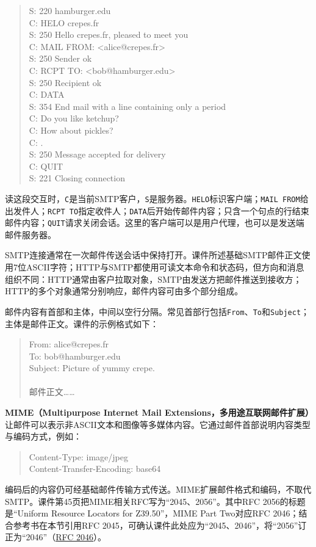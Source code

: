 \begin{quote}\small\ttfamily
S: 220 hamburger.edu\\
C: HELO crepes.fr\\
S: 250 Hello crepes.fr, pleased to meet you\\
C: MAIL FROM: <alice@crepes.fr>\\
S: 250 Sender ok\\
C: RCPT TO: <bob@hamburger.edu>\\
S: 250 Recipient ok\\
C: DATA\\
S: 354 End mail with a line containing only a period\\
C: Do you like ketchup?\\
C: How about pickles?\\
C: .\\
S: 250 Message accepted for delivery\\
C: QUIT\\
S: 221 Closing connection
\end{quote}

读这段交互时，\texttt{C}是当前SMTP客户，\texttt{S}是服务器。\texttt{HELO}标识客户端；\texttt{MAIL FROM}给出发件人；\texttt{RCPT TO}指定收件人；\texttt{DATA}后开始传邮件内容；只含一个句点的行结束邮件内容；\texttt{QUIT}请求关闭会话。这里的客户端可以是用户代理，也可以是发送端邮件服务器。

SMTP连接通常在一次邮件传送会话中保持打开。课件所述基础SMTP邮件正文使用7位ASCII字符；HTTP与SMTP都使用可读文本命令和状态码，但方向和消息组织不同：HTTP通常由客户拉取对象，SMTP由发送方把邮件推送到接收方；HTTP的多个对象通常分别响应，邮件内容可由多个部分组成。

邮件内容有首部和主体，中间以空行分隔。常见首部行包括\texttt{From}、\texttt{To}和\texttt{Subject}；主体是邮件正文。课件的示例格式如下：
\begin{quote}\small\ttfamily
From: alice@crepes.fr\\
To: bob@hamburger.edu\\
Subject: Picture of yummy crepe.\\
\\
邮件正文……
\end{quote}

\textbf{MIME（Multipurpose Internet Mail Extensions，多用途互联网邮件扩展）}让邮件可以表示非ASCII文本和图像等多媒体内容。它通过邮件首部说明内容类型与编码方式，例如：
\begin{quote}\small\ttfamily
Content-Type: image/jpeg\\
Content-Transfer-Encoding: base64
\end{quote}
编码后的内容仍可经基础邮件传输方式传送。MIME扩展邮件格式和编码，不取代SMTP。课件第45页把MIME相关RFC写为“2045、2056”。其中RFC 2056的标题是“Uniform Resource Locators for Z39.50”，MIME Part Two对应RFC 2046；结合参考书在本节引用RFC 2045，可确认课件此处应为“2045、2046”，将“2056”订正为“2046”（\href{https://www.rfc-editor.org/info/rfc2046/}{RFC 2046}）。

